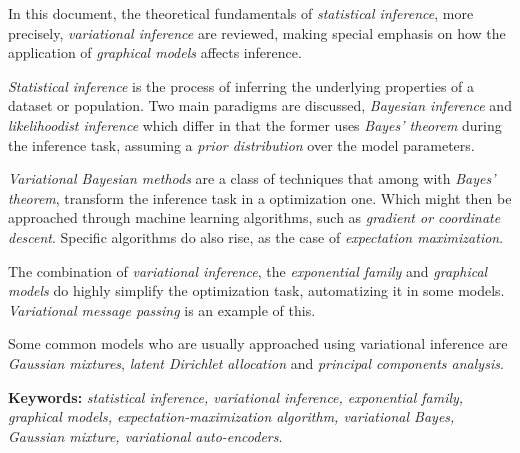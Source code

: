 In this document, the theoretical fundamentals of \emph{statistical inference}, more precisely, \emph{variational inference} are reviewed, making special emphasis on how the application of \emph{graphical models} affects inference.

\emph{Statistical inference} is the process of inferring the underlying properties of a dataset or population. Two main paradigms are discussed, \emph{Bayesian inference} and \emph{likelihoodist inference} which differ in that the former uses \emph{Bayes' theorem} during the inference task, assuming a \emph{prior distribution} over the model parameters.

\emph{Variational Bayesian methods} are a class of techniques that among with \emph{Bayes' theorem}, transform the inference task in a optimization one. Which might then be approached through machine learning algorithms, such as \emph{gradient or coordinate descent}. Specific algorithms do also rise, as the case of \emph{expectation maximization}.

The combination of \emph{variational inference}, the \emph{exponential family} and \emph{graphical models} do highly simplify the optimization task, automatizing it in some models. \emph{Variational message passing} is an example of this.

Some common models who are usually approached using variational inference are \emph{Gaussian mixtures}, \emph{latent Dirichlet allocation} and \emph{principal components analysis}.


\textbf{Keywords:} \emph{statistical inference, variational inference, exponential family, graphical models, expectation-maximization algorithm, variational Bayes, Gaussian mixture, variational auto-encoders}.
